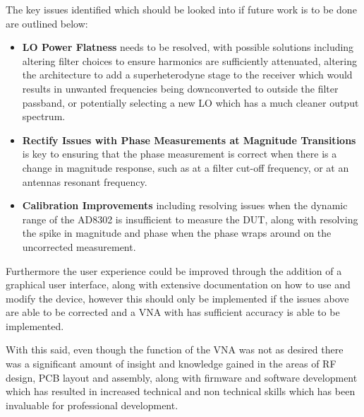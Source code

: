 The key issues identified which should be looked into if future work is to be done are outlined below: 
\begin{itemize}
	\item \textbf{LO Power Flatness} needs to be resolved, with possible solutions including altering filter choices to ensure harmonics are sufficiently attenuated, altering the architecture to add a superheterodyne stage to the receiver which would results in unwanted frequencies being downconverted to outside the filter passband, or potentially selecting a new LO which has a much cleaner output spectrum.
	\item \textbf{Rectify Issues with Phase Measurements at Magnitude Transitions} is key to ensuring that the phase measurement is correct when there is a change in magnitude response, such as at a filter cut-off frequency, or at an antennas resonant frequency. 
	\item \textbf{Calibration Improvements} including resolving issues when the dynamic range of the AD8302 is insufficient to measure the DUT, along with resolving the spike in magnitude and phase when the phase wraps around on the uncorrected measurement. 
\end{itemize}
Furthermore the user experience could be improved through the addition of a graphical user interface, along with extensive documentation on how to use and modify the device, however this should only be implemented if the issues above are able to be corrected and a VNA with has sufficient accuracy is able to be implemented. 

With this said, even though the function of the VNA was not as desired there was a significant amount of insight and knowledge gained in the areas of RF design, PCB layout and assembly, along with firmware and software development which has resulted in increased technical and non technical skills which has been invaluable for professional development. 